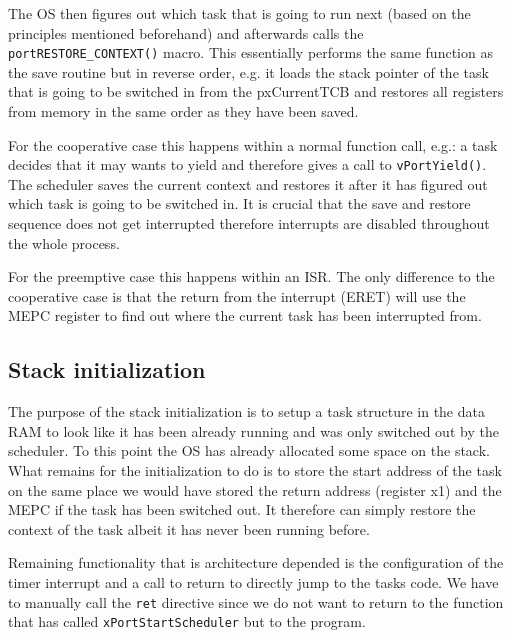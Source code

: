 The OS then figures out which task that is going to run next (based on the principles mentioned beforehand) and afterwards calls the \verb+portRESTORE_CONTEXT()+ macro. This essentially performs the same function as the save routine but in reverse order, e.g. it loads the stack pointer of the task that is going to be switched in from the pxCurrentTCB and restores all registers from memory in the same order as they have been saved.


For the cooperative case this happens within a normal function call, e.g.: a task decides that it may wants to yield and therefore gives a call to \verb+vPortYield()+. The scheduler saves the current context and restores it after it has figured out which task is going to be switched in. It is crucial that the save and restore sequence does not get interrupted therefore interrupts are disabled throughout the whole process.

For the preemptive case this happens within an ISR. The only difference to the cooperative case is that the return from the interrupt (ERET) will use the MEPC register to find out where the current task has been interrupted from.

\subsection{Stack initialization}

The purpose of the stack initialization is to setup a task structure in the data RAM to look like it has been already running and was only switched out by the scheduler. To this point the OS has already allocated some space on the stack. What remains for the initialization to do is to store the start address of the task on the same place we would have stored the return address (register x1) and the MEPC if the task has been switched out. It therefore can simply restore the context of the task albeit it has never been running before.

Remaining functionality that is architecture depended is the configuration of the timer interrupt and a call to return to directly jump to the tasks code. We have to manually call the \verb+ret+ directive since we do not want to return to the function that has called \verb+xPortStartScheduler+ but to the program.

